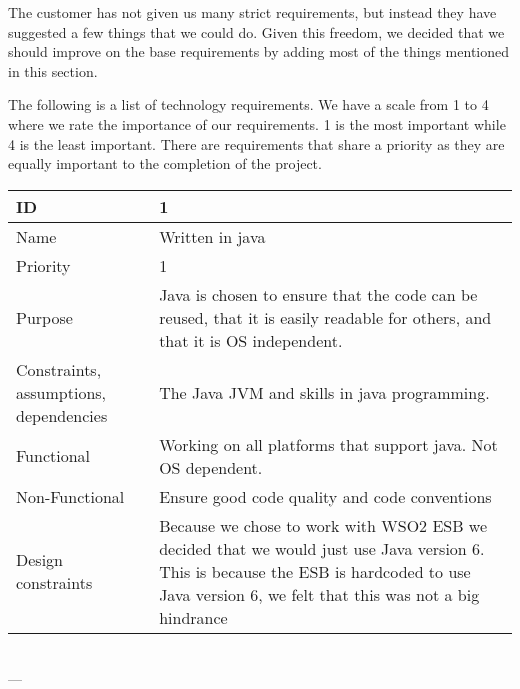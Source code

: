     The customer has not given us many strict requirements, but instead they have suggested a few things that we could do. Given this freedom, we decided that we should improve on the base requirements by adding most of the things mentioned in this section. 

    The following is a list of technology requirements. We have a scale from 1 to 4 where we rate the importance of our requirements. 1 is the most important while 4 is the least important. There are requirements that share a priority as they are equally important to the completion of the project. 

\begin{center}
    \begin{tabular}{| p{4cm} | p{8cm} |}
        \hline
        ID & 1 \\
        \hline
        Name & Written in java  \\
        \hline
        Priority & 1 \\
        \hline
        Purpose & Java is chosen to ensure that the code can be reused, that it is easily readable for others, and that it is OS independent. \\
        \hline 
        Constraints, assumptions, dependencies & The Java JVM and skills in java programming. \\
        \hline  
        Functional & Working on all platforms that support java. Not OS dependent. \\
        \hline
        Non-Functional & Ensure good code quality and code conventions \\ 
        \hline
        Design constraints & Because we chose to work with WSO2 ESB we decided that we would just use Java version 6. This is because the ESB is hardcoded to use Java version 6, we felt that this was not a big hindrance  \\
        \hline
    \end{tabular}
    \\  ---  \\
    

\end{center}
